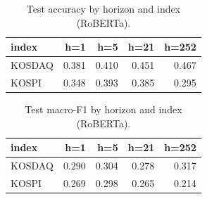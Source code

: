 \begin{table}[t]\centering
\caption{Test accuracy by horizon and index (RoBERTa).}
\begin{tabular}{lrrrr}
\toprule
index & h=1 & h=5 & h=21 & h=252 \\
\midrule
KOSDAQ & 0.381 & 0.410 & 0.451 & 0.467 \\
KOSPI & 0.348 & 0.393 & 0.385 & 0.295 \\
\bottomrule
\end{tabular}
\end{table}

\begin{table}[t]\centering
\caption{Test macro-F1 by horizon and index (RoBERTa).}
\begin{tabular}{lrrrr}
\toprule
index & h=1 & h=5 & h=21 & h=252 \\
\midrule
KOSDAQ & 0.290 & 0.304 & 0.278 & 0.317 \\
KOSPI & 0.269 & 0.298 & 0.265 & 0.214 \\
\bottomrule
\end{tabular}
\end{table}